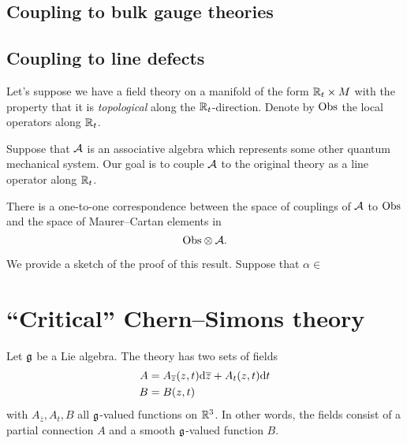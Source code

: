 \documentclass[11pt]{amsart}
\def\zbar{{\overline{z}}}
\begin{document}
\subsection*{Coupling to bulk gauge theories}

\subsection{Coupling to line defects} 

Let's suppose we have a field theory on a manifold of the form $\mathbb R_t \times M$ with the property that it is {\em topological} along the $\mathbb R_t$-direction. 
Denote by ${\rm Obs}$ the local operators along $\mathbb R_t$. 

Suppose that $\mathcal A$ is an associative algebra which represents some other quantum mechanical system. 
Our goal is to couple $\mathcal A$ to the original theory as a line operator along $\mathbb R_t$. 

\begin{prop}\label{prop:line}
There is a one-to-one correspondence between the space of couplings of $\mathcal A$ to ${\rm Obs}$ and the space of Maurer--Cartan elements in 
\[
{\rm Obs} \otimes \mathcal A .
\]
\end{prop}

We provide a sketch of the proof of this result. 
Suppose that $\alpha \in $



\section{``Critical'' Chern--Simons theory}

Let $\mathfrak g$ be a Lie algebra. 
The theory has two sets of fields
\begin{align*}
A & = A_{\zbar} (z,t) \d \zbar + A_{t} (z, t) \d t \\
B & = B (z,t) 
\end{align*}
with $A_{\zbar}, A_t, B$ all $\mathfrak g$-valued functions on $\mathbb R^3$.
In other words, the fields consist of a partial connection $A$ and a smooth $\mathfrak g$-valued function $B$.
\end{document}
